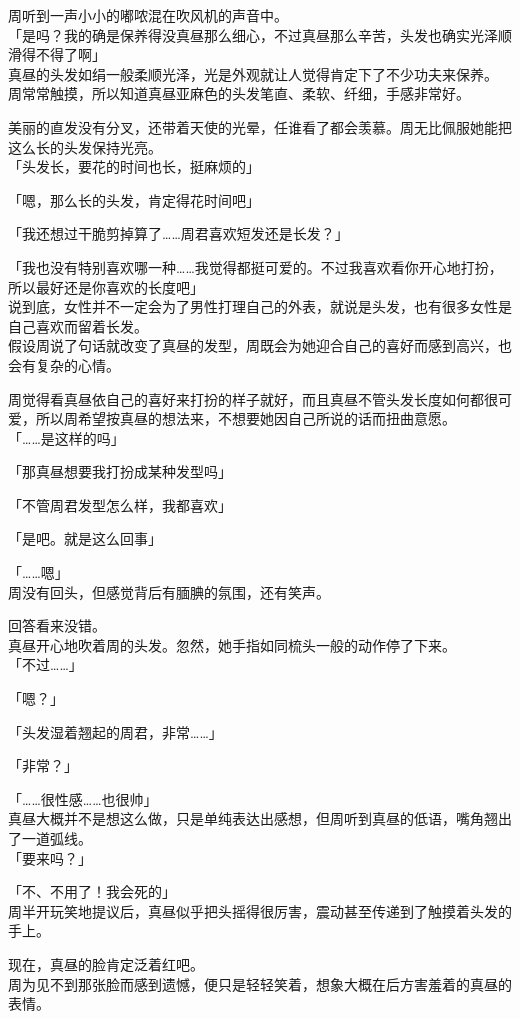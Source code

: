 周听到一声小小的嘟哝混在吹风机的声音中。\\

「是吗？我的确是保养得没真昼那么细心，不过真昼那么辛苦，头发也确实光泽顺滑得不得了啊」\\

真昼的头发如绢一般柔顺光泽，光是外观就让人觉得肯定下了不少功夫来保养。\\

周常常触摸，所以知道真昼亚麻色的头发笔直、柔软、纤细，手感非常好。

美丽的直发没有分叉，还带着天使的光晕，任谁看了都会羡慕。周无比佩服她能把这么长的头发保持光亮。\\

「头发长，要花的时间也长，挺麻烦的」

「嗯，那么长的头发，肯定得花时间吧」

「我还想过干脆剪掉算了……周君喜欢短发还是长发？」

「我也没有特别喜欢哪一种……我觉得都挺可爱的。不过我喜欢看你开心地打扮，所以最好还是你喜欢的长度吧」\\

说到底，女性并不一定会为了男性打理自己的外表，就说是头发，也有很多女性是自己喜欢而留着长发。\\

假设周说了句话就改变了真昼的发型，周既会为她迎合自己的喜好而感到高兴，也会有复杂的心情。

周觉得看真昼依自己的喜好来打扮的样子就好，而且真昼不管头发长度如何都很可爱，所以周希望按真昼的想法来，不想要她因自己所说的话而扭曲意愿。\\

「……是这样的吗」

「那真昼想要我打扮成某种发型吗」

「不管周君发型怎么样，我都喜欢」

「是吧。就是这么回事」

「……嗯」\\

周没有回头，但感觉背后有腼腆的氛围，还有笑声。

回答看来没错。\\

真昼开心地吹着周的头发。忽然，她手指如同梳头一般的动作停了下来。\\

「不过……」

「嗯？」

「头发湿着翘起的周君，非常……」

「非常？」

「……很性感……也很帅」\\

真昼大概并不是想这么做，只是单纯表达出感想，但周听到真昼的低语，嘴角翘出了一道弧线。\\

「要来吗？」

「不、不用了！我会死的」\\

周半开玩笑地提议后，真昼似乎把头摇得很厉害，震动甚至传递到了触摸着头发的手上。

现在，真昼的脸肯定泛着红吧。\\

周为见不到那张脸而感到遗憾，便只是轻轻笑着，想象大概在后方害羞着的真昼的表情。
